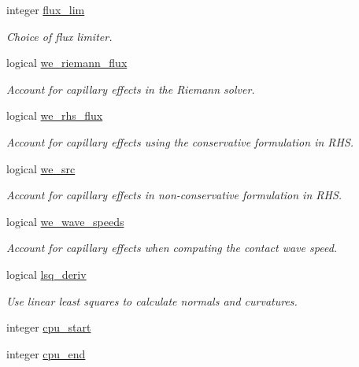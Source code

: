 \begin{DoxyCompactItemize}
integer \hyperlink{namespacem__global__parameters_acbb163a79ff0011a4327c3fb65a04c14}{flux\+\_\+lim}
\begin{DoxyCompactList}\small\item\em Choice of flux limiter. \end{DoxyCompactList}\item 
logical \hyperlink{namespacem__global__parameters_a99557d578d538a853b5fd9e445ad6303}{we\+\_\+riemann\+\_\+flux}
\begin{DoxyCompactList}\small\item\em Account for capillary effects in the Riemann solver. \end{DoxyCompactList}\item 
logical \hyperlink{namespacem__global__parameters_acfd358e345eac06daf89ca40651ba2c8}{we\+\_\+rhs\+\_\+flux}
\begin{DoxyCompactList}\small\item\em Account for capillary effects using the conservative formulation in R\+HS. \end{DoxyCompactList}\item 
logical \hyperlink{namespacem__global__parameters_a897b4f61353235b3af13bac633d5b9a0}{we\+\_\+src}
\begin{DoxyCompactList}\small\item\em Account for capillary effects in non-\/conservative formulation in R\+HS. \end{DoxyCompactList}\item 
logical \hyperlink{namespacem__global__parameters_afe755241e6fe1e3a132aec6feab74ae4}{we\+\_\+wave\+\_\+speeds}
\begin{DoxyCompactList}\small\item\em Account for capillary effects when computing the contact wave speed. \end{DoxyCompactList}\item 
logical \hyperlink{namespacem__global__parameters_ad367bbe26f93b9fd058c58ec11337fdf}{lsq\+\_\+deriv}
\begin{DoxyCompactList}\small\item\em Use linear least squares to calculate normals and curvatures. \end{DoxyCompactList}\item 
integer \hyperlink{namespacem__global__parameters_a5422a3820409740b5c3b0b2e88bdb2b0}{cpu\+\_\+start}
\item 
integer \hyperlink{namespacem__global__parameters_a8ed3dee47bbaa5de7ae564ca9d770404}{cpu\+\_\+end}
\item 

\end{DoxyCompactItemize}
